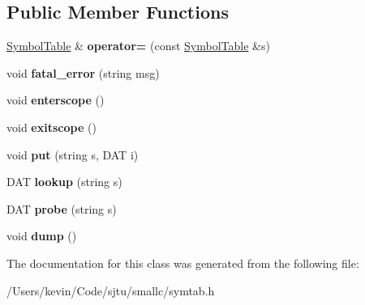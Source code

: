 \subsection*{Public Member Functions}
\begin{DoxyCompactItemize}
\item 
\mbox{\label{class_symbol_table_a13a91c38adca7a32c0c79573f7286f5b}} 
\hyperlink{class_symbol_table}{Symbol\+Table} \& {\bfseries operator=} (const \hyperlink{class_symbol_table}{Symbol\+Table} \&s)
\item 
\mbox{\label{class_symbol_table_a08cecd4ea775f2ef78eeff19eadac32f}} 
void {\bfseries fatal\+\_\+error} (string msg)
\item 
\mbox{\label{class_symbol_table_a7a7f91a10ecd02760523919219f49492}} 
void {\bfseries enterscope} ()
\item 
\mbox{\label{class_symbol_table_aae704765597a4da4d763cf018afcd07a}} 
void {\bfseries exitscope} ()
\item 
\mbox{\label{class_symbol_table_a9b7b92cd9be9fff7a042ce5fe8eb12f3}} 
void {\bfseries put} (string s, D\+AT i)
\item 
\mbox{\label{class_symbol_table_a68e684fe62e86c8527e56e619dadd307}} 
D\+AT {\bfseries lookup} (string s)
\item 
\mbox{\label{class_symbol_table_a046c3b1432ba64cfdaa429e035ca7f8c}} 
D\+AT {\bfseries probe} (string s)
\item 
\mbox{\label{class_symbol_table_abe94f148c8fb2c2a4985b40ef3a0fd6a}} 
void {\bfseries dump} ()
\end{DoxyCompactItemize}


The documentation for this class was generated from the following file\+:\begin{DoxyCompactItemize}
\item 
/\+Users/kevin/\+Code/sjtu/smallc/symtab.\+h\end{DoxyCompactItemize}
